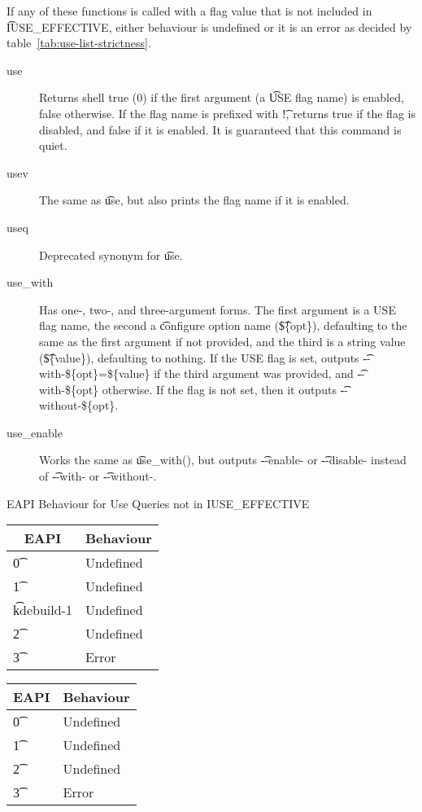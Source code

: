 If any of these functions is called with a flag value that is not included in \t{IUSE\_EFFECTIVE},
either behaviour is undefined or it is an error as decided by table~\ref{tab:use-list-strictness}.

\begin{description}
\item[use] Returns shell true (0) if the first argument (a \t{USE} flag name) is enabled, false
    otherwise.  If the flag name is prefixed with \t{!}, returns true if the flag is disabled, and
    false if it is enabled. It is guaranteed that this command is quiet.
\item[usev] The same as \t{use}, but also prints the flag name if it is enabled.
\item[useq] Deprecated synonym for \t{use}.
\item[use\_with] Has one-, two-, and three-argument forms. The first argument is a USE flag name,
    the second a \t{configure} option name (\t{\$\{opt\}}), defaulting to the same as the first argument
    if not provided, and the third is a string value (\t{\$\{value\}}), defaulting to nothing. If the
    USE flag is set, outputs \t{-{}-with-\$\{opt\}=\$\{value\}} if the third argument was provided, and
    \t{-{}-with-\$\{opt\}} otherwise. If the flag is not set, then it outputs \t{-{}-without-\$\{opt\}}.
\item[use\_enable] Works the same as \t{use\_with()}, but outputs \t{-{}-enable-} or \t{-{}-disable-}
instead of \t{-{}-with-} or \t{-{}-without-}.
\end{description}

\begin{centertable}{EAPI Behaviour for Use Queries not in IUSE\_EFFECTIVE} \label{tab:use-list-strictness}
\IFKDEBUILDELSE
{
    \begin{tabular}{ l l }
        \toprule
            \multicolumn{1}{c}{\textbf{EAPI}} &
            \multicolumn{1}{c}{\textbf{Behaviour}} \\
            \midrule
    \t{0} & Undefined \\
    \t{1} & Undefined  \\
    \t{kdebuild-1} & Undefined  \\
    \t{2} & Undefined \\
    \t{3} & Error \\
    \bottomrule
    \end{tabular}
}{
    \begin{tabular}{ l l }
        \toprule
            \multicolumn{1}{c}{\textbf{EAPI}} &
            \multicolumn{1}{c}{\textbf{Behaviour}} \\
            \midrule
    \t{0} & Undefined \\
    \t{1} & Undefined  \\
    \t{2} & Undefined \\
    \t{3} & Error \\
    \bottomrule
    \end{tabular}
}
\end{centertable}

